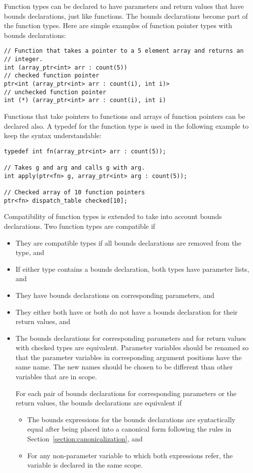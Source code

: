 Function types can be declared to have parameters and return values that have bounds
declarations, just like functions.  The bounds declarations become part of the function types.
Here are simple examples of function pointer types with bounds declarations:
\begin{lstlisting}
// Function that takes a pointer to a 5 element array and returns an 
// integer.
int (array_ptr<int> arr : count(5))
// checked function pointer
ptr<int (array_ptr<int> arr : count(i), int i)>
// unchecked function pointer
int (*) (array_ptr<int> arr : count(i), int i)
\end{lstlisting}
Functions that take pointers to functions and arrays of function pointers can
be declared also.  A typedef for the function type is used in the following example
to keep the syntax understandable:
\begin{lstlisting}
typedef int fn(array_ptr<int> arr : count(5));

// Takes g and arg and calls g with arg.
int apply(ptr<fn> g, array_ptr<int> arg : count(5));

// Checked array of 10 function pointers
ptr<fn> dispatch_table checked[10];
\end{lstlisting}

Compatibility of function types is extended to take into account
bounds declarations.  Two function types are compatible if
\begin{itemize}
\item They are compatible types if all bounds declarations are removed from the type, and
\item If either type contains a bounds declaration, both types have parameter lists, and
\item They have bounds declarations on corresponding parameters, and
\item They either both have or both do not have a bounds declaration for their return values, and
\item The bounds declarations for corresponding parameters and for return values with
checked types are equivalent.
Parameter variables should be renamed so that the parameter variables
in corresponding argument positions have the same name.  The new names should be chosen
to be different than other variables that are in scope.

For each pair of bounds declarations for corresponding
parameters or the return values, the bounds declarations are equivalent if
\begin{itemize}
\item The bounds expressions for the bounds declarations are syntactically equal
after being placed into a canonical form following the rules in Section~\ref{section:canonicalization}, and
\item  For any non-parameter variable  to which both expressions refer, the variable is
declared in the same scope.
\end{itemize}
\end{itemize}

